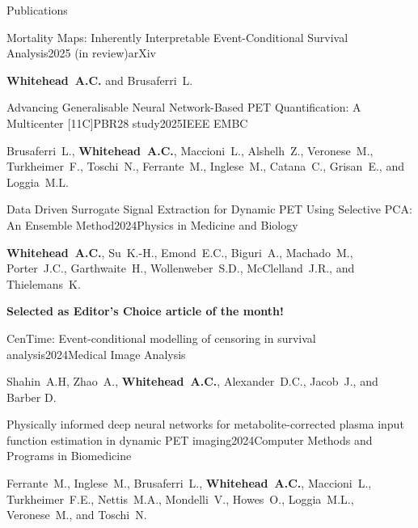 \documentclass{cv}
\begin{document}
    \begin{rSection}{Publications}
        \item \begin{rSubsection}{Mortality Maps: Inherently Interpretable Event-Conditional Survival Analysis}{2025 (in review)}{arXiv}{}
            \item \textbf{Whitehead~A.C.} and Brusaferri~L. \\
        \end{rSubsection}
        
        \item \begin{rSubsection}{Advancing Generalisable Neural Network-Based PET Quantification: A Multicenter [11C]PBR28 study}{2025}{IEEE EMBC}{}
            \item Brusaferri~L., \textbf{Whitehead~A.C.}, Maccioni~L., Alshelh~Z., Veronese~M., Turkheimer~F., Toschi~N., Ferrante~M., Inglese~M., Catana~C., Grisan~E., and Loggia~M.L. \\
        \end{rSubsection}
        
        \item \begin{rSubsection}{Data Driven Surrogate Signal Extraction for Dynamic PET Using Selective PCA: An Ensemble Method}{2024}{Physics in Medicine and Biology}{}
            \item \textbf{Whitehead~A.C.}, Su~K.-H., Emond~E.C., Biguri~A., Machado~M., Porter~J.C., Garthwaite~H., Wollenweber~S.D., McClelland~J.R., and Thielemans~K. \\

            \item \textbf{Selected as Editor’s Choice article of the month!} \\
        \end{rSubsection}
        
        \item \begin{rSubsection}{CenTime: Event-conditional modelling of censoring in survival analysis}{2024}{Medical Image Analysis}{}
            \item Shahin~A.H, Zhao~A., \textbf{Whitehead~A.C.}, Alexander~D.C., Jacob~J., and Barber D.
        \end{rSubsection}

        \item \begin{rSubsection}{Physically informed deep neural networks for metabolite-corrected plasma input function estimation in dynamic PET imaging}{2024}{Computer Methods and Programs in Biomedicine}{}
            \item Ferrante~M., Inglese~M., Brusaferri~L., \textbf{Whitehead~A.C.}, Maccioni~L., Turkheimer~F.E., Nettis~M.A., Mondelli~V., Howes~O., Loggia~M.L., Veronese~M., and Toschi~N.
        \end{rSubsection}


\end{rSection}
\end{document}
